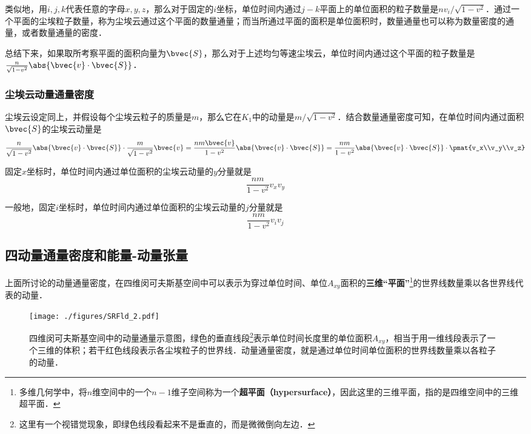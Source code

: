 类似地，用$i, j, k$代表任意的字母$x, y, z$，那么对于固定的$i$坐标，单位时间内通过$j-k$平面上的单位面积的粒子数量是$nv_i/\sqrt{1-v^2}$．通过一个平面的尘埃粒子数量，称为尘埃云通过这个平面的数量通量；而当所通过平面的面积是单位面积时，数量通量也可以称为数量密度的通量，或者数量通量的密度．

总结下来，如果取所考察平面的面积向量为$\bvec{S}$，那么对于上述均匀等速尘埃云，单位时间内通过这个平面的粒子数量是$\frac{n}{\sqrt{1-v^2}}\abs{\bvec{v}\cdot\bvec{S}}$．

\subsubsection{尘埃云动量通量密度}

尘埃云设定同上，并假设每个尘埃云粒子的质量是$m$，那么它在$K_1$中的动量是$m/\sqrt{1-v^2}$．结合数量通量密度可知，在单位时间内通过面积$\bvec{S}$的尘埃云动量是
\begin{equation}
\frac{n}{\sqrt{1-v^2}}\abs{\bvec{v}\cdot\bvec{S}}\cdot\frac{m}{\sqrt{1-v^2}}\bvec{v}=\frac{nm\bvec{v}}{1-v^2}\abs{\bvec{v}\cdot\bvec{S}}=\frac{nm}{1-v^2}\abs{\bvec{v}\cdot\bvec{S}}\cdot\pmat{v_x\\v_y\\v_z}
\end{equation}

固定$x$坐标时，单位时间内通过单位面积的尘埃云动量的$y$分量就是
\begin{equation}
\frac{nm}{1-v^2}v_xv_y
\end{equation}

一般地，固定$i$坐标时，单位时间内通过单位面积的尘埃云动量的$j$分量就是
\begin{equation}\label{SRFld_eq1}
\frac{nm}{1-v^2}v_iv_j
\end{equation}

\subsection{四动量通量密度和能量-动量张量}

上面所讨论的动量通量密度，在四维闵可夫斯基空间中可以表示为穿过单位时间、单位$A_{xy}$面积的\textbf{三维“平面”}\footnote{多维几何学中，将$n$维空间中的一个$n-1$维子空间称为一个\textbf{超平面（hypersurface）}，因此这里的三维平面，指的是四维空间中的三维超平面．}的世界线数量乘以各世界线代表的动量．

\begin{figure}[ht]
\centering
\texttt{[image: ./figures/SRFld\_2.pdf]}
\caption{四维闵可夫斯基空间中的动量通量示意图，绿色的垂直线段\footnote{这里有一个视错觉现象，即绿色线段看起来不是垂直的，而是微微倒向左边．}表示单位时间长度里的单位面积$A_{xy}$，相当于用一维线段表示了一个三维的体积；若干红色线段表示各尘埃粒子的世界线．动量通量密度，就是通过单位时间单位面积的世界线数量乘以各粒子的动量．} \label{SRFld_fig2}
\end{figure}

